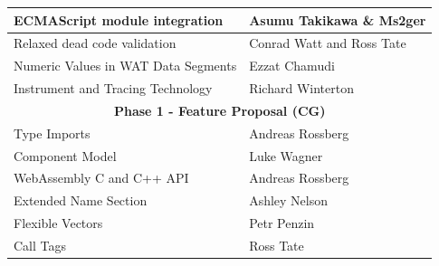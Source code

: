 \begin{table}[htbp]
\begin{tabular}{|ll|}
    \multicolumn{1}{|l|}{ECMAScript module integration}                  & Asumu Takikawa \& Ms2ger                                                                                                        \\ \hline
    \multicolumn{1}{|l|}{Relaxed dead code validation}                   & Conrad Watt and Ross Tate                                                                                                       \\ \hline
    \multicolumn{1}{|l|}{Numeric Values in WAT Data Segments}            & Ezzat Chamudi                                                                                                                   \\ \hline
    \multicolumn{1}{|l|}{Instrument and Tracing Technology}              & Richard Winterton                                                                                                               \\ \hline
    \multicolumn{2}{|c|}{\textbf{Phase 1 - Feature Proposal (CG)}}                                                                                                                                         \\ \hline
    \multicolumn{1}{|l|}{Type Imports}                                   & Andreas Rossberg                                                                                                                \\ \hline
    \multicolumn{1}{|l|}{Component Model}                                & Luke Wagner                                                                                                                     \\ \hline
    \multicolumn{1}{|l|}{WebAssembly C and C++ API}                      & Andreas Rossberg                                                                                                                \\ \hline
    \multicolumn{1}{|l|}{Extended Name Section}                          & Ashley Nelson                                                                                                                   \\ \hline
    \multicolumn{1}{|l|}{Flexible Vectors}                               & Petr Penzin                                                                                                                     \\ \hline
    \multicolumn{1}{|l|}{Call Tags}                                      & Ross Tate                                                                                                                       \\ \hline

\end{tabular}
\end{table}
